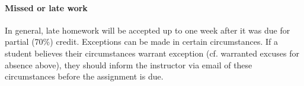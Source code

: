 \paragraph{Missed or late work}
In general, late homework will be accepted up to one week after it was due for partial (70\%) credit. Exceptions can be made in certain circumstances. If a student believes their circumstances warrant exception (cf. warranted excuses for absence above), they should inform the instructor via email of these circumstances before the assignment is due.